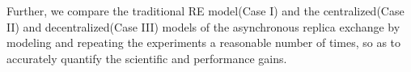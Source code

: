 \documentclass[a4paper,10pt]{article}
\newcommand{\jhanote}[1]{ {\textcolor{red} { ***shantenu: #1 }}}
\newcommand{\athotanote}[1]{ {\textcolor{green} { ***athota: #1 }}}
\newcommand{\jhanote}[1]{}
\newcommand{\athotanote}[1]{}
\begin{document}
Further, we compare the traditional RE model(Case I) and the centralized(Case II) and decentralized(Case III) models of the asynchronous replica exchange by modeling and repeating the experiments a reasonable number of times, so as to accurately quantify the scientific and performance gains. %


 
  
 
\end{document}
